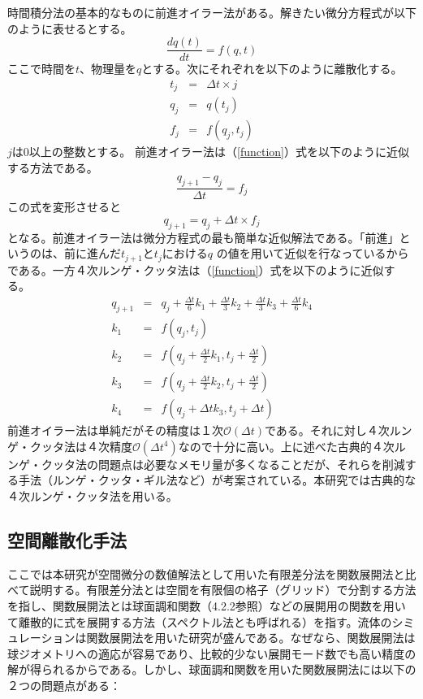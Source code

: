 \documentclass[12pt]{jsarticle}
\begin{document}
時間積分法の基本的なものに前進オイラー法がある。解きたい微分方程式が以下のように表せるとする。
\begin{equation} \label{function}
\frac{dq(t)}{dt} = f(q,t) 
\end{equation}
ここで時間を$t$、物理量を$q$とする。次にそれぞれを以下のように離散化する。
\begin{eqnarray}
t_j &=& \Delta t \times j      \\
q_j &=& q(t_j)      \\
f_j &=& f(q_j,t_j)     
\end{eqnarray}
$j$は0以上の整数とする。
前進オイラー法は（\ref{function}）式を以下のように近似する方法である。
\begin{equation}
\frac{q_{j+1}-q_j}{\Delta t} = f_j 
\end{equation}
この式を変形させると
\begin{equation}
q_{j+1} = q_j + \Delta t \times  f_j 
\end{equation}
となる。前進オイラー法は微分方程式の最も簡単な近似解法である。「前進」というのは、前に進んだ$t_{j+1}$と$t_j$における$q$ の値を用いて近似を行なっているからである。一方４次ルンゲ・クッタ法は（\ref{function}）式を以下のように近似する。
\begin{eqnarray}
q_{j+1} &=& q_j + \frac{\Delta t}{6}k_1 + \frac{\Delta t}{3}k_2 + \frac{\Delta t}{3}k_3 + \frac{\Delta t}{6}k_4 \\
k_1 &=& f(q_j,t_j)  \\
k_2 &=& f(q_j+\frac{\Delta t}{2}k_1,t_j+\frac{\Delta t}{2})  \\
k_3 &=& f(q_j+\frac{\Delta t}{2}k_2,t_j+\frac{\Delta t}{2})  \\
k_4 &=& f(q_j+\Delta tk_3,t_j+\Delta t)
\end{eqnarray}
前進オイラー法は単純だがその精度は１次$\mathcal{O} \left( \Delta t \right)$である。それに対し４次ルンゲ・クッタ法は４次精度$\mathcal{O} \left( \Delta t^4 \right)$なので十分に高い。上に述べた古典的４次ルンゲ・クッタ法の問題点は必要なメモリ量が多くなることだが、それらを削減する手法（ルンゲ・クッタ・ギル法など）が考案されている。本研究では古典的な４次ルンゲ・クッタ法を用いる。

\subsection{空間離散化手法}
ここでは本研究が空間微分の数値解法として用いた有限差分法を関数展開法と比べて説明する。有限差分法とは空間を有限個の格子（グリッド）で分割する方法を指し、関数展開法とは球面調和関数（4.2.2参照）などの展開用の関数を用いて離散的に式を展開する方法（スペクトル法とも呼ばれる）を指す。流体のシミュレーションは関数展開法を用いた研究が盛んである\cite{mininni2006magnetohydrodynamic}。なぜなら、関数展開法は球ジオメトリへの適応が容易であり、比較的少ない展開モード数でも高い精度の解が得られるからである。しかし、球面調和関数を用いた関数展開法には以下の２つの問題点がある：
\end{document}
